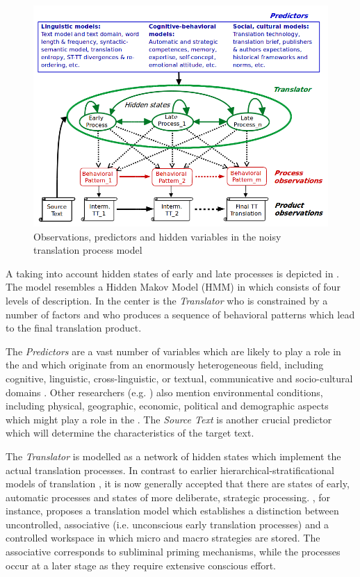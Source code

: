 \documentclass[output=paper]{LSP/langsci}
\begin{document}
\begin{figure}[b]
\includegraphics[width=\textwidth]{figures/carl-schaefer/Noisy-TP-Model.png}
\caption{Observations, predictors and hidden variables in the noisy translation process model}
\label{carl-schaeffer:fig:noisytpmodel}
\end{figure}

A  taking into account hidden states of early and late processes is depicted in . The model resembles a Hidden Makov Model (HMM) in  which consists of four levels of description. In the center is the \textit{Translator} who is constrained by a number of factors and who produces a sequence of behavioral patterns which lead to the final translation product. 

The \textit{Predictors} are a vast number of variables which are likely to play a role in the  and which originate from an enormously heterogeneous field, including cognitive, linguistic, cross-linguistic, or textual, communicative and socio-cultural domains \citep{Toury2004}. Other researchers (e.g. \citealt{Risku2014}) also mention environmental conditions, including physical, geographic, economic, political and demographic aspects which might play a role in the . The \textit{Source Text} is another crucial predictor which will determine the characteristics of the target text.

The \textit{Translator} is modelled as a network of hidden states which implement the actual translation processes. In contrast to earlier hierarchical-stratificational models of translation \citep{Nida1964, Seleskovitch1975}, it is now generally accepted that there are states of early, automatic processes and states of more deliberate, strategic processing. \citet{Honig1991}, for instance, proposes a translation model which establishes a distinction between uncontrolled, associative  (i.e. unconscious early translation processes) and a controlled workspace in which micro and macro strategies are stored. The associative  corresponds to subliminal priming mechanisms, while the  processes occur at a later stage as they require extensive conscious effort. 
\end{document}
